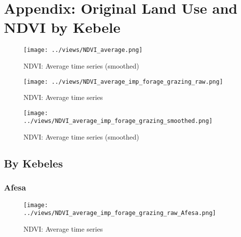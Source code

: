 \documentclass[10pt,a4paper,onecolumn]{article}
\begin{document}
\pagebreak

\section{Appendix: Original Land Use and NDVI by Kebele }


\begin{figure}[H] \centering
  \captionsetup{justification=centering}
\caption{NDVI: Average time series (smoothed)} 
\centering


\texttt{[image: ../views/NDVI\_average.png]}

\end{figure}




\begin{figure}[H] \centering
  \captionsetup{justification=centering}
\caption{NDVI: Average time series} 
\centering


\texttt{[image: ../views/NDVI\_average\_imp\_forage\_grazing\_raw.png]}

\end{figure}



\begin{figure}[H] \centering
  \captionsetup{justification=centering}
\caption{NDVI: Average time series (smoothed)} 
\centering


\texttt{[image: ../views/NDVI\_average\_imp\_forage\_grazing\_smoothed.png]}

\end{figure}



\pagebreak

\subsection{By Kebeles}

\subsubsection{Afesa}
\begin{figure}[H] \centering
  \captionsetup{justification=centering}
\caption{NDVI: Average time series } 
\centering


\texttt{[image: ../views/NDVI\_average\_imp\_forage\_grazing\_raw\_Afesa.png]}

\end{figure}
\end{document}
